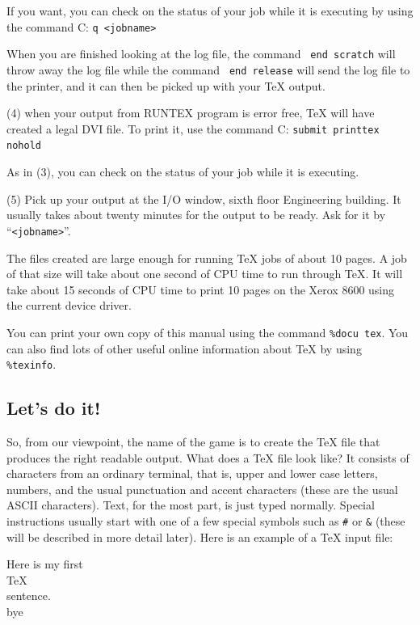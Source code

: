 If you want, you can check on the status of your job while it is 
executing by using the command 
\beginlist
\itemitem{} C: {\tt q <jobname>} 
\endlist

When you are finished looking at the log file, the command {\tt 
end scratch} will throw away the log file while the command {\tt 
end release} will send the log file to the printer, and it can 
then be picked up with your \TeX{} output. 

\beginlist
\item{(4)} when your output from RUNTEX program is error free, \TeX{} 
\endlist
will have created a legal DVI file.  To print it, use the 
command 
\beginlist
\itemitem{} C: {\tt submit printtex nohold} 
\endlist

As in (3), you can check on the status of your job while it is 
executing. 
\beginlist
\item{(5)} Pick up your output at the I/O window, sixth floor 
\endlist
Engineering building.  It usually takes about twenty minutes for the 
output to be ready.  Ask for it by ``{\tt <jobname>}''. 

\endlist

The files created are large enough for running \TeX{} jobs of about 
10 pages.  A job of that size will take about one second of CPU time 
to run through \TeX\null.  It will take about 15 seconds of CPU time to 
print 10 pages on the Xerox 8600 using the current device driver. 

You can print your own copy of this manual using the command 
{\tt \%docu tex}. You can also find lots of other useful 
online information about \TeX{} by using {\tt \%texinfo}. 

\subsection{Let's do it!} 

So, from our viewpoint, the name of the game is to create the \TeX{} 
file that produces the right readable output. What does 
a \TeX{} file look like? It consists of characters from an 
ordinary terminal, that is, upper and lower case letters, 
numbers, and the usual punctuation and accent characters (these 
are the usual ASCII characters). Text, for the most part, is just 
typed normally. Special instructions usually start with one of a 
few special symbols such as {\tt \#} or {\tt \&} (these will be 
described in more detail later). Here is an example of a \TeX{} 
input file: 

\beginuser 
Here is my first \\TeX\\ sentence. 
\\bye 
\enduser 
{} \toindex{ } 


